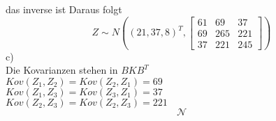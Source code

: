 \documentclass{article}
\begin{document}
	das inverse ist
	Daraus folgt\\
	\[Z\sim N((21,37,8)^T, \begin{bmatrix}61&69&37\\69&265&221\\37&221&245\end{bmatrix})\]
	c)\\
	Die Kovarianzen stehen in $BKB^T$\\
	$Kov(Z_1,Z_2)=Kov(Z_2,Z_1)=69$\\
	$Kov(Z_1,Z_3)=Kov(Z_3,Z_1)=37$\\
	$Kov(Z_2,Z_3)=Kov(Z_2,Z_3)=221$\\
	
	\[\mathscr{N}\]
\end{document}
